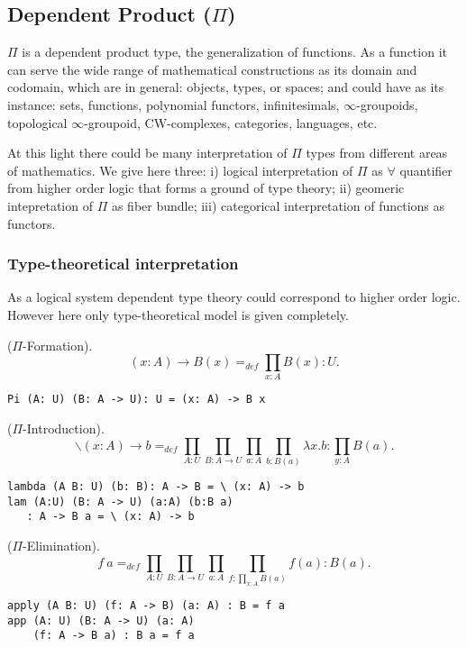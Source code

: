 \documentclass{article}
\begin{document}
\subsection{Dependent Product ($\Pi$)}

$\Pi$ is a dependent product type, the generalization of functions.
As a function it can serve the wide range of mathematical constructions as its domain and codomain,
which are in general: objects, types, or spaces; and could have as its
instance: sets, functions, polynomial functors, infinitesimals, $\infty$-groupoids,
topological $\infty$-groupoid, CW-complexes,
categories, languages, etc.

At this light there could be many interpretation of $\Pi$ types from different
areas of mathematics. We give here three:
i) logical interpretation of $\Pi$ as $\forall$ quantifier from higher order logic that forms a ground of type theory;
ii) geomeric intepretation of $\Pi$ as fiber bundle;
iii) categorical interpretation of functions as functors.

\subsubsection*{Type-theoretical interpretation}

As a logical system dependent type theory could correspond to higher order logic.
However here only type-theoretical model is given completely.

\begin{definition} ($\Pi$-Formation).
$$(x: A) \rightarrow B(x) =_{def} \prod_{x:A}B(x) : U.$$
\begin{lstlisting}
Pi (A: U) (B: A -> U): U = (x: A) -> B x
\end{lstlisting}
\end{definition}

\begin{definition} ($\Pi$-Introduction).
$$\backslash (x: A) \rightarrow b =_{def} \prod_{A:U}\prod_{B:A \rightarrow U}\prod_{a: A}\prod_{b:B(a)}\lambda x.b : \prod_{y:A}B(a).$$
\begin{lstlisting}
lambda (A B: U) (b: B): A -> B = \ (x: A) -> b
lam (A:U) (B: A -> U) (a:A) (b:B a)
   : A -> B a = \ (x: A) -> b
\end{lstlisting}
\end{definition}

\begin{definition} ($\Pi$-Elimination).
$$f\ a =_{def} \prod_{A:U}\prod_{B: A \rightarrow U}\prod_{a:A}\prod_{f: \prod_{x:A}B(a)}f(a) : B(a).$$
\begin{lstlisting}
apply (A B: U) (f: A -> B) (a: A) : B = f a
app (A: U) (B: A -> U) (a: A)
    (f: A -> B a) : B a = f a
\end{lstlisting}
\end{definition}
\end{document}
